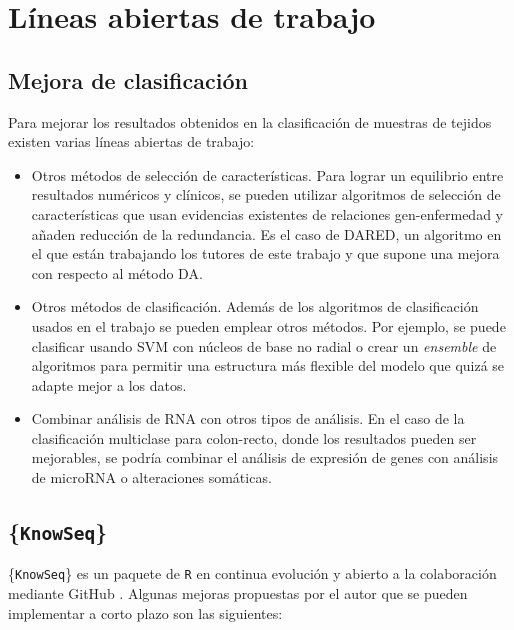 \chapter{Líneas abiertas de trabajo}

\section{Mejora de clasificación}

Para mejorar los resultados obtenidos en la clasificación de muestras de tejidos existen varias líneas abiertas de trabajo:

\begin{itemize}
	\item Otros métodos de selección de características. Para lograr un equilibrio entre resultados numéricos y clínicos, se pueden utilizar algoritmos de selección de características que usan evidencias existentes de relaciones gen-enfermedad y añaden reducción de la redundancia. Es el caso de DARED, un algoritmo en el que están trabajando los tutores de este trabajo y que supone una mejora con respecto al método DA.
	\item Otros métodos de clasificación. Además de los algoritmos de clasificación usados en el trabajo se pueden emplear otros métodos. Por ejemplo, se puede clasificar usando SVM con núcleos de base no radial o crear un \textit{ensemble} de algoritmos para permitir una estructura más flexible del modelo que quizá se adapte mejor a los datos.
	\item Combinar análisis de RNA con otros tipos de análisis. En el caso de la clasificación multiclase para colon-recto, donde los resultados pueden ser mejorables, se podría combinar el análisis de expresión de genes con análisis de microRNA o alteraciones somáticas.
\end{itemize}

\section{\{\texttt{KnowSeq}\}}

\{\texttt{KnowSeq}\} es un paquete de \texttt{R} en continua evolución y abierto a la colaboración mediante GitHub \cite{KnowSeq}. Algunas mejoras propuestas por el autor que se pueden implementar a corto plazo son las siguientes:

